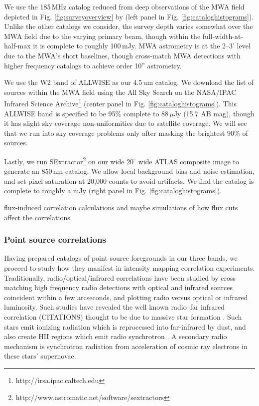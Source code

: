 \documentclass[preprint]{aastex}
\begin{document}
We use the 185\,MHz catalog reduced from deep observations of the MWA field depicted in Fig. \ref{fig:surveyoverview} by \citep{PattiCatalog1} (left panel in Fig. \ref{fig:cataloghistograms}). Unlike the other catalogs we consider, the survey depth varies somewhat over the MWA field due to the varying primary beam, though within the full-width-at-half-max it is complete to roughly 100\,mJy. MWA astrometry is at the 2--3' level due to the MWA's short baselines, though \citep{PattiCatalog1} cross-match MWA detections with higher frequency catalogs to achieve order 10'' astrometry. 

We use the W2 band of ALLWISE \citep{Wright2010,allwise} as our 4.5\,um catalog. We download the list of sources within the MWA field using the All Sky Search on the NASA/IPAC Infrared Science Archive\footnote{http://irsa.ipac.caltech.edu} (center panel in Fig. \ref{fig:cataloghistograms}). This ALLWISE band is specified to be 95\% complete to 88\,$\mu$Jy (15.7 AB mag), though it has slight sky coverage non-uniformities due to satellite coverage. We will see that we run into sky coverage problems only after masking the brightest 90\% of sources.

Lastly, we run SExtractor\footnote{http://www.astromatic.net/software/sextractors} \citep{sextractor} on our wide $20^\circ$ wide ATLAS composite image to generate an 850\,nm catalog. We allow local background bias and noise estimation, and set pixel saturation at 20,000 counts to avoid artifacts. We find the catalog is complete to roughly a mJy (right panel in Fig. \ref{fig:cataloghistograms}). 





flux-induced correlation calculations and maybe simulations of how flux cuts affect the correlations

\subsubsection{Point source correlations}

Having prepared catalogs of point source foregrounds in our three bands, we proceed to study how they manifest in intensity mapping correlation experiments. Traditionally, radio/optical/infrared correlations have been studied by cross matching high frequency radio detections with optical and infrared sources coincident within a few arcseconds, and plotting radio versus optical or infrared luminosity. Such studies have revealed the well known radio--far infrared correlation (CITATIONS) thought to be due to massive star formation \citep[e.g.][]{helou85,dejong85,yun01,xu94}. Such stars emit ionizing radiation which is reprocessed into far-infrared by dust, and also create HII regions which emit radio synchrotron \citep{xu94}. A secondary radio mechanism is synchrotron radiation from acceleration of cosmic ray electrons in these stars' supernovae. 
\end{document}
